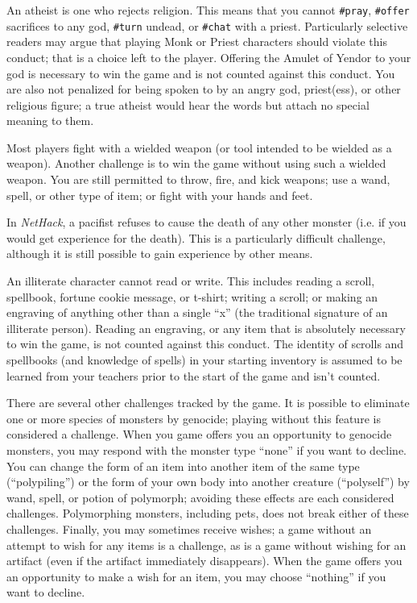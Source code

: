 An atheist is one who rejects religion.  This means that you cannot
{\tt \#pray}, {\tt \#offer} sacrifices to any god,
{\tt \#turn} undead, or {\tt \#chat} with a priest.
Particularly selective readers may argue that playing Monk or Priest
characters should violate this conduct; that is a choice left to the
player.  Offering the Amulet of Yendor to your god is necessary to
win the game and is not counted against this conduct.  You are also
not penalized for being spoken to by an angry god, priest(ess), or
other religious figure; a true atheist would hear the words but
attach no special meaning to them.

Most players fight with a wielded weapon (or tool intended to be
wielded as a weapon).  Another challenge is to win the game without
using such a wielded weapon.  You are still permitted to throw,
fire, and kick weapons; use a wand, spell, or other type of item;
or fight with your hands and feet.

In {\it NetHack\/}, a pacifist refuses to cause the death of any other monster
(i.e. if you would get experience for the death).  This is a particularly
difficult challenge, although it is still possible to gain experience
by other means.

An illiterate character cannot read or write.  This includes reading
a scroll, spellbook, fortune cookie message, or t-shirt; writing a
scroll; or making an engraving of anything other than a single ``x'' (the
traditional signature of an illiterate person).  Reading an engraving,
or any item that is absolutely necessary to win the game, is not counted
against this conduct.  The identity of scrolls and spellbooks (and
knowledge of spells) in your starting inventory is assumed to be
learned from your teachers prior to the start of the game and isn't
counted.

There are several other challenges tracked by the game.  It is possible
to eliminate one or more species of monsters by genocide; playing without
this feature is considered a challenge.  When you game offers you an
opportunity to genocide monsters, you may respond with the monster type
``none'' if you want to decline.  You can change the form of an item into
another item of the same type (``polypiling'') or the form of your own
body into another creature (``polyself'') by wand, spell, or potion of
polymorph; avoiding these effects are each considered challenges.
Polymorphing monsters, including pets, does not break either of these
challenges.
Finally, you may sometimes receive wishes; a game without an attempt to
wish for any items is a challenge, as is a game without wishing for
an artifact (even if the artifact immediately disappears).  When the
game offers you an opportunity to make a wish for an item, you may
choose ``nothing'' if you want to decline.

